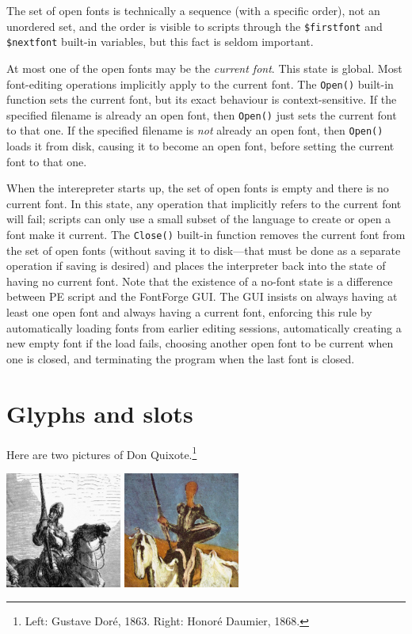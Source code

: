 \documentclass[11pt]{report}
\begin{document}
The set of open fonts is technically a sequence (with a specific order), not
an unordered set, and the order is visible to scripts through the
\verb|$firstfont| and \verb|$nextfont| built-in variables, but this fact is
seldom important.

At most one of the open fonts may be the \emph{current font}.  This state is
global.  Most font-editing operations implicitly apply to the current font. 
The \texttt{Open()} built-in function sets the current font, but its exact
behaviour is context-sensitive.  If the specified filename is already an
open font, then \texttt{Open()} just sets the current font to that one.  If
the specified filename is \emph{not} already an open font, then
\texttt{Open()} loads it from disk, causing it to become an open font, before
setting the current font to that one.

When the interepreter starts up, the set of open fonts is empty and there is
no current font.  In this state, any operation that implicitly refers to the
current font will fail; scripts can only use a small subset of the language
to create or open a font make it current.  The \texttt{Close()} built-in
function removes the current font from the set of open fonts (without saving
it to disk---that must be done as a separate operation if saving is desired)
and places the interpreter back into the state of having no current font. 
Note that the existence of a no-font state is a difference between PE script
and the FontForge GUI.  The GUI insists on always having at least one open
font and always having a current font, enforcing this rule by automatically
loading fonts from earlier editing sessions, automatically creating a new
empty font if the load fails, choosing another open font to be current when
one is closed, and terminating the program when the last font is closed.

\section{Glyphs and slots}

Here are two pictures of Don Quixote.\footnote{Left: Gustave
Dor\'{e}, 1863.  Right: Honor\'{e} Daumier, 1868.}

\begin{center}
\includegraphics[width=1.5in]{quixote-dore.jpg}\qquad
\includegraphics[width=1.5in]{quixote-daumier.jpg}
\end{center}
\end{document}

